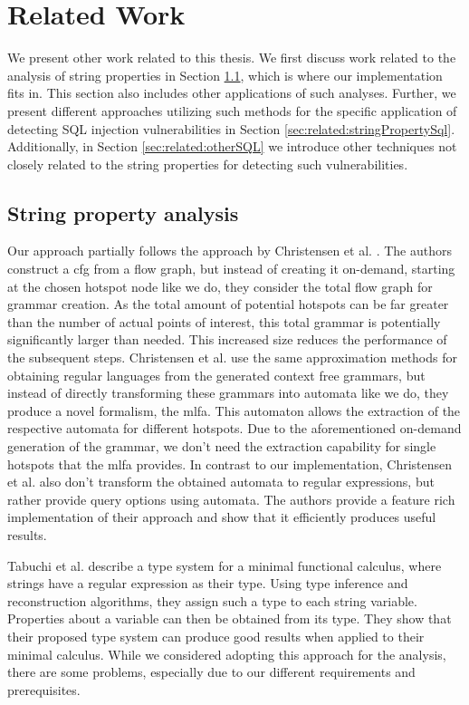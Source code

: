 \chapter{Related Work}
\label{chapter:RelatedWork}

We present other work related to this thesis. We first discuss work related to the analysis of string properties in Section \ref{sec:related:stringproperty}, which is where our implementation fits in. This section also includes other applications of such analyses. Further, we present different approaches utilizing such methods for the specific application of detecting SQL injection vulnerabilities in Section \ref{sec:related:stringPropertySql}. Additionally, in Section \ref{sec:related:otherSQL} we introduce other techniques not closely related to the string properties for detecting such vulnerabilities.


\section{String property analysis}\label{sec:related:stringproperty}

Our approach partially follows the approach by Christensen et al. \cite{brics}. The authors construct a \acl{cfg} from a flow graph, but instead of creating it on-demand, starting at the chosen hotspot node like we do, they consider the total flow graph for grammar creation.
As the total amount of potential hotspots can be far greater than the number of actual points of interest, this total grammar is potentially significantly larger than needed. This increased size reduces the performance of the subsequent steps.
Christensen et al. use the same approximation methods for obtaining regular languages from the generated context free grammars, but instead of directly transforming these grammars into automata like we do, they produce a novel formalism, the \ac{mlfa}.
This automaton allows the extraction of the respective automata for different hotspots. Due to the aforementioned on-demand generation of the grammar, we don't need the extraction capability for single hotspots that the \ac{mlfa} provides. In contrast to our implementation, Christensen et al. also don't transform the obtained automata to regular expressions, but rather provide query options using automata.
The authors provide a feature rich implementation of their approach and show that it efficiently produces useful results.

Tabuchi et al. \cite{regex_types} describe a type system for a minimal functional calculus, where strings have a regular expression as their type. Using type inference and reconstruction algorithms, they assign such a type to each string variable. Properties about a variable can then be obtained from its type.
They show that their proposed type system can produce good results when applied to their minimal calculus. While we considered adopting this approach for the analysis, there are some problems, especially due to our different requirements and prerequisites. 

